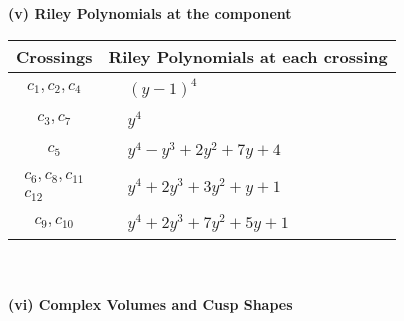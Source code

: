 \documentclass[1p]{elsarticle_modified}
\theoremstyle{definition}
\begin{document}
\newpage\renewcommand{\arraystretch}{1}
\flushleft \textbf{(v) Riley Polynomials at the component}\newline \\
\begin{tabular}{m{50pt}|m{274pt}}
Crossings & \hspace{64pt}Riley Polynomials at each crossing \\
\hline $$\begin{aligned}c_{1},c_{2},c_{4}\end{aligned}$$&$\begin{aligned}
&(y-1)^4
\end{aligned}$\\
\hline $$\begin{aligned}c_{3},c_{7}\end{aligned}$$&$\begin{aligned}
&y^4
\end{aligned}$\\
\hline $$\begin{aligned}c_{5}\end{aligned}$$&$\begin{aligned}
&y^4- y^3+2 y^2+7 y+4
\end{aligned}$\\
\hline $$\begin{aligned}c_{6},c_{8},c_{11}\\c_{12}\end{aligned}$$&$\begin{aligned}
&y^4+2 y^3+3 y^2+y+1
\end{aligned}$\\
\hline $$\begin{aligned}c_{9},c_{10}\end{aligned}$$&$\begin{aligned}
&y^4+2 y^3+7 y^2+5 y+1
\end{aligned}$\\
\hline
\end{tabular}\\~\\
\newpage\flushleft \textbf{(vi) Complex Volumes and Cusp Shapes}
\end{document}
